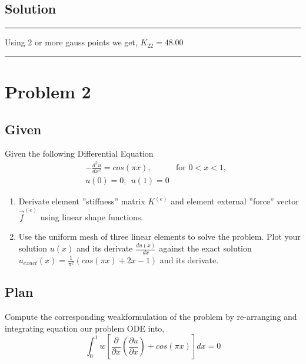 \documentclass[a4paper]{memoir}
\begin{document}
\subsection{Solution}
\begin{minipage}{300pt}
	\begin{center}{
		\begin{shaded}
			\hrule
			\vspace{20pt}
			Using 2 or more gauss points we get, $K_{22} = 48.00$ %
			\vspace{16pt}
			\hrule
		\end{shaded}
	}
	\end{center}
\end{minipage}

\section{Problem 2}
\subsection{Given}
Given the following Differential Equation
\begin{align*}
	&-\frac{d^2 u}{dx^2} = cos(\pi x), &\text{for } 0<x<1, \\
	& u(0) = 0, \:\: u(1) = 0
\end{align*}

\begin{enumerate}
	\item Derivate element ''stiffness'' matrix $K^{(e)}$ and element external ''force'' vector $\vec{f}^{(e)}$ using linear shape functions.
	\item Use the uniform mesh of three linear elements to solve the problem. Plot your solution $u(x)$ and its derivate $\frac{du(x)}{dx}$ against the exact solution $u_{exact}(x) = \frac{1}{\pi^2}(cos(\pi x)+2x-1)$ and its derivate.
\end{enumerate}

\subsection{Plan}
Compute the corresponding weakformulation of the problem by re-arranging and integrating equation our problem ODE into,
\begin{equation}
	\int_0^1 w\left[ \frac{\partial}{\partial x} \left( \frac{\partial u}{\partial x} \right) + cos(\pi x) \right] dx = 0
	\label{eq:galerkin}
\end{equation}
\end{document}
